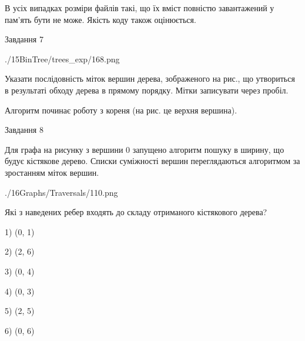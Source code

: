 \documentclass[12pt, ukrainian]{article}
\begin{document}
{В усіх випадках розміри файлів такі, що їх вміст повністю завантажений у пам'ять бути не може. Якість коду також оцінюється.



\vspace{10mm}\par

\newpage
\begin{minipage}[t]{9.7cm}
               
{\begin{center}Завдання {7}\end{center}}
\vspace{-6mm}

\begin{center}
	{./15BinTree/trees_exp/168.png}
\end{center}
Указати послідовність міток вершин дерева, зображеного на рис., що утвориться в результаті обходу дерева в прямому порядку. Мітки записувати через пробіл.\par Алгоритм починає роботу з кореня (на рис. це верхня вершина).\par

\end{minipage}
\vline \hspace{8mm}
\begin{minipage}[t]{8.0cm}
               
{\begin{center}Завдання {8}\end{center}}
\vspace{-6mm}
Для графа на рисунку з вершини 0 запущено алгоритм пошуку в ширину, що будує кістякове дерево. Списки суміжності вершин переглядаються алгоритмом за зростанням міток вершин.\par
\begin{center}
	{./16Graphs/Traversals/110.png}
\end{center}
\par Які з наведених ребер входять до складу отриманого кістякового дерева?\par
1) (0, 1)\par
2) (2, 6)\par
3) (0, 4)\par
4) (0, 3)\par
5) (2, 5)\par
6) (0, 6)\par
{\vskip 15pt} \par


\end{minipage}}
\end{document}
